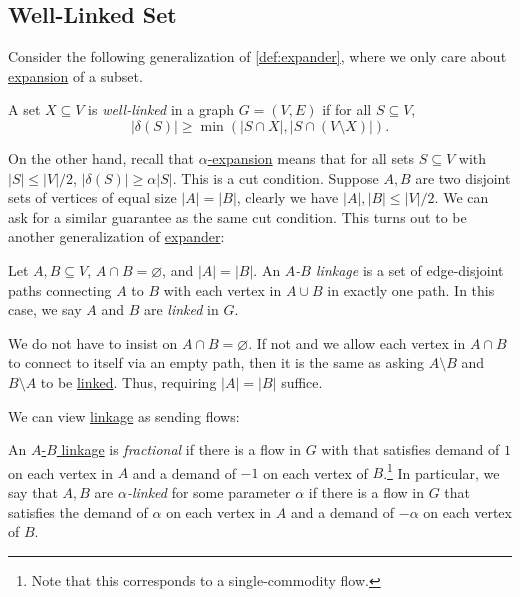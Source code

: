 \subsection{Well-Linked Set}
Consider the following generalization of \autoref{def:expander}, where we only care about \hyperref[def:expansion]{expansion} of a subset.

\begin{definition}\label{def:well-linked}
	A set \(X \subseteq V\) is \emph{well-linked} in a graph \(G = (V, E)\) if for all \(S \subseteq V\),
	\[
		\lvert \delta (S) \rvert
		\geq \min (\lvert S \cap X \rvert , \lvert S \cap (V \setminus X) \rvert ).
	\]
\end{definition}

On the other hand, recall that \hyperref[def:expansion]{\(\alpha \)-expansion} means that for all sets \(S \subseteq V\) with \(\lvert S \rvert \leq \lvert V \rvert / 2\), \(\lvert \delta (S) \rvert \geq \alpha \lvert S \rvert \). This is a cut condition. Suppose \(A, B\) are two disjoint sets of vertices of equal size \(\lvert A \rvert = \lvert B \rvert \), clearly we have \(\lvert A \rvert , \lvert B \rvert \leq \lvert V \rvert / 2\). We can ask for a similar guarantee as the same cut condition. This turns out to be another generalization of \hyperref[def:expander]{expander}:

\begin{definition}[Linkage]\label{def:linkage}
	Let \(A, B \subseteq V\), \(A \cap B = \varnothing \), and \(\lvert A \rvert = \lvert B \rvert \). An \emph{\(A\)-\(B\) linkage} is a set of edge-disjoint paths connecting \(A\) to \(B\) with each vertex in \(A \cup B\) in exactly one path. In this case, we say \(A\) and \(B\) are \emph{linked} in \(G\).
\end{definition}

\begin{note}
	We do not have to insist on \(A \cap B = \varnothing \). If not and we allow each vertex in \(A \cap B\) to connect to itself via an empty path, then it is the same as asking \(A\setminus B\) and \(B\setminus A\) to be \hyperref[def:linkage]{linked}. Thus, requiring \(\lvert A \rvert = \lvert B \rvert \) suffice.
\end{note}

We can view \hyperref[def:linkage]{linkage} as sending flows:

\begin{definition}\label{def:fractional-linkage}
	An \hyperref[def:linkage]{\(A\)-\(B\) linkage} is \emph{fractional} if there is a flow in \(G\) with that satisfies demand of \(1\) on each vertex in \(A\) and a demand of \(-1\) on each vertex of \(B\).\footnote{Note that this corresponds to a single-commodity flow.} In particular, we say that \(A, B\) are \emph{\(\alpha \)-linked} for some parameter \(\alpha \) if there is a flow in \(G\) that satisfies the demand of \(\alpha \) on each vertex in \(A\) and a demand of \(-\alpha \) on each vertex of \(B\).
\end{definition}

